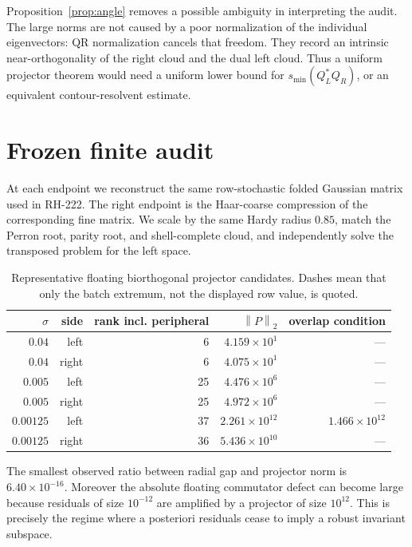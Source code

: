 \documentclass[11pt]{article}
\theoremstyle{remark}
\newcommand{\norm}[1]{\left\lVert#1\right\rVert}
\begin{document}
Proposition~\ref{prop:angle} removes a possible ambiguity in interpreting
the audit.  The large norms are not caused by a poor normalization of the
individual eigenvectors: QR normalization cancels that freedom.  They record
an intrinsic near-orthogonality of the right cloud and the dual left cloud.
Thus a uniform projector theorem would need a uniform lower bound for
$s_{\min}(Q_L^*Q_R)$, or an equivalent contour-resolvent estimate.

\section{Frozen finite audit}

At each endpoint we reconstruct the same row-stochastic folded Gaussian
matrix used in RH-222.  The right endpoint is the Haar-coarse compression of
the corresponding fine matrix.  We scale by the same Hardy radius $0.85$,
match the Perron root, parity root, and shell-complete cloud, and independently
solve the transposed problem for the left space.

\begin{table}[ht]
\centering
\small
\begin{tabular}{rrrrr}
\toprule
$\sigma$ & side & rank incl. peripheral & $\norm P_2$ & overlap condition\\
\midrule
$0.04$ & left  & 6  & $4.159\times10^1$ & ---\\
$0.04$ & right & 6  & $4.075\times10^1$ & ---\\
$0.005$ & left  & 25 & $4.476\times10^6$ & ---\\
$0.005$ & right & 25 & $4.972\times10^6$ & ---\\
$0.00125$ & left  & 37 & $2.261\times10^{12}$ & $1.466\times10^{12}$\\
$0.00125$ & right & 36 & $5.436\times10^{10}$ & ---\\
\bottomrule
\end{tabular}
\caption{Representative floating biorthogonal projector candidates.  Dashes
mean that only the batch extremum, not the displayed row value, is quoted.}
\end{table}

The smallest observed ratio between radial gap and projector norm is
$6.40\times10^{-16}$.  Moreover the absolute floating commutator defect can
become large because residuals of size $10^{-12}$ are amplified by a
projector of size $10^{12}$.  This is precisely the regime where a posteriori
residuals cease to imply a robust invariant subspace.
\end{document}
